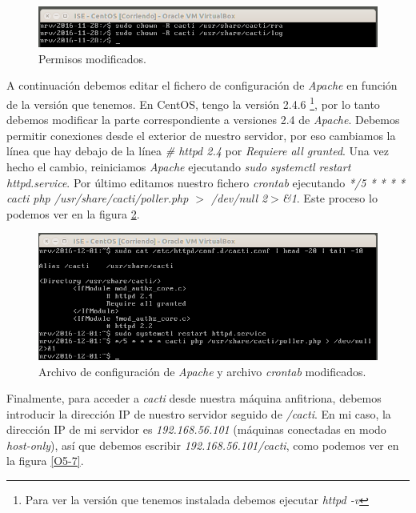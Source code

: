 \documentclass[a4paper,titlepage,12pt]{scrartcl}	%
\numberwithin{figure}{section} %
\numberwithin{table}{section} %
\begin{document}
	\begin{figure}[H]
		\includegraphics[width=\linewidth]{./Imagenes/O5-5.png}
		\vspace{-0.5cm}
		\caption[Permisos modificados.]{Permisos modificados.}
		\label{O5-5}
	\end{figure}
	
	A continuación debemos editar el fichero de configuración de \textit{Apache} en función de la versión que tenemos. En CentOS, tengo la versión 2.4.6 \footnote{Para ver la versión que tenemos instalada debemos ejecutar \textit{httpd -v}}, por lo tanto debemos modificar la parte correspondiente a versiones 2.4 de \textit{Apache}. Debemos permitir conexiones desde el exterior de nuestro servidor, por eso cambiamos la línea que hay debajo de la línea \textit{\# httpd 2.4} por \textit{Requiere all granted}. Una vez hecho el cambio, reiniciamos \textit{Apache} ejecutando \textit{sudo systemctl restart httpd.service}. Por último editamos nuestro fichero \textit{crontab} ejecutando \textit{*/5 * * * * cacti php /usr/share/cacti/poller.php $>$ /dev/null 2$>$\&1}. Este proceso lo podemos ver en la figura \ref{O5-6}.
	
	\begin{figure}[H]
		\includegraphics[width=\linewidth]{./Imagenes/O5-6.png}
		\vspace{-0.5cm}
		\caption[Archivo de configuración de \textit{Apache} y archivo \textit{crontab} modificados.]{Archivo de configuración de \textit{Apache} y archivo \textit{crontab} modificados.}
		\label{O5-6}
	\end{figure}
	
	Finalmente, para acceder a \textit{cacti} desde nuestra máquina anfitriona, debemos introducir la dirección IP de nuestro servidor seguido de \textit{/cacti}. En mi caso, la dirección IP de mi servidor es \textit{192.168.56.101} (máquinas conectadas en modo \textit{host-only}), así que debemos escribir \textit{192.168.56.101/cacti}, como podemos ver en la figura \ref{O5-7}.
	
\end{document}
